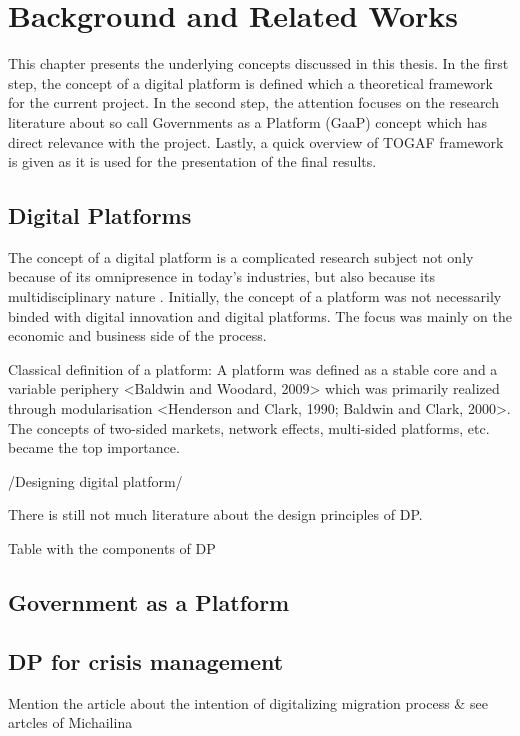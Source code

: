 \setcounter{reaction}{0}%


\chapter{Background and Related Works} \label{chapter2}

This chapter presents the underlying concepts discussed in this thesis. In the first step, the concept of a digital platform is defined which a theoretical framework for the current project. In the second step, the attention focuses on the research literature about so call Governments as a Platform (GaaP) concept which has direct relevance with the project. Lastly, a quick overview of TOGAF framework is given as it is used for the presentation of the final results.

\section{Digital Platforms}
The concept of a digital platform is a complicated research subject not only because of its omnipresence in today's industries, but also because its multidisciplinary nature \citep{deReuver:2018}. Initially, the concept of a platform was not necessarily binded with digital innovation and digital platforms. The focus was mainly on the economic and business side of the process. 

Classical definition of a platform: A platform was defined as a stable core and a variable periphery <Baldwin and Woodard, 2009> which was primarily realized through modularisation <Henderson and Clark, 1990; Baldwin and Clark, 2000>. The concepts of two-sided markets, network effects, multi-sided platforms, etc. became the top importance.

/Designing digital platform/ 

There is still not much literature about the design principles of DP.

Table with the components of DP

\section{Government as a Platform}



\section{DP for crisis management}
Mention the article about the intention of digitalizing migration process & see artcles of Michailina

